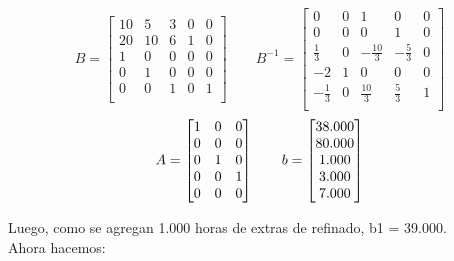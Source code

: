\documentclass[10pt,a4paper]{article}
\begin{document}
\begin{enumerate}
    \[
    B = \begin{bmatrix}
    10 & 5  & 3 & 0 & 0 \\
    20 & 10 & 6 & 1 & 0 \\
    1  & 0  & 0 & 0 & 0 \\
    0  & 1  & 0 & 0 & 0 \\
    0  & 0  & 1 & 0 & 1 \\
    \end{bmatrix}
    \hspace{2em}
    B^{-1} = \begin{bmatrix}
        0           & 0 &    1	        &   0            &	0 \\
        0           & 0 &    0	        &   1            &	0 \\
      \frac{1}{3}   & 0 & -\frac{10}{3} & -\frac{5}{3}   &	0 \\
       -2           & 1 &    0	        &   0            &	0 \\
       -\frac{1}{3} & 0 & \frac{10}{3}	& \frac{5}{3}    &	1 \\
    \end{bmatrix}
    \]
    \vspace{1em}
    \[
        A = \begin{bmatrix}
        1 & 0 & 0 \\
        0 & 0 & 0 \\
        0 & 1 & 0 \\
        0 & 0 & 1 \\
        0 & 0 & 0 \\
        \end{bmatrix}
        \hspace{2em}
        b = \begin{bmatrix}
            $38.000$ \\
            $80.000$ \\
            $1.000$  \\
            $3.000$  \\
            $7.000$  \\
        \end{bmatrix}
    \]

    \vspace{1em}

    Luego, como se agregan 1.000 horas de extras de refinado, b1 = 39.000. \\
    Ahora hacemos:


\end{enumerate}
\end{document}
